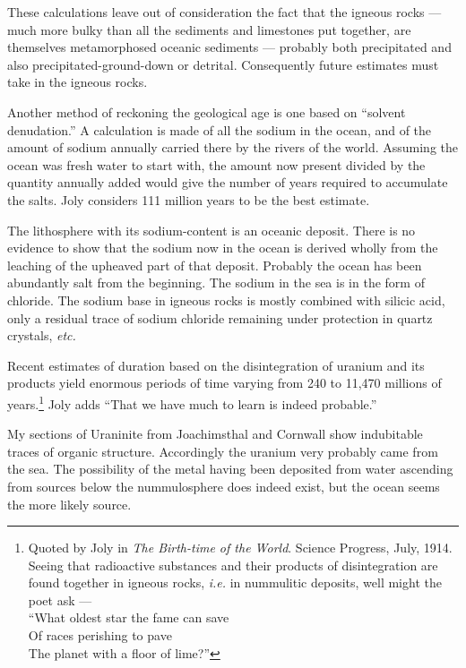\documentclass[a4paper, 12pt, oneside, landscape]{article}
\begin{document}
These calculations leave out of consideration the fact that the igneous rocks --- much more bulky than all the sediments and limestones put together, are themselves metamorphosed oceanic sediments --- probably both precipitated and also precipitated-ground-down or detrital. Consequently future estimates must take in the igneous rocks.

Another method of reckoning the geological age is one based on ``solvent denudation.'' A calculation is made of all the sodium in the ocean, and of the amount of sodium annually carried there by the rivers of the world. Assuming the ocean was fresh water to start with, the amount now present divided by the quantity annually added would give the number of years required to accumulate the salts. Joly considers 111 million years to be the best estimate.

The lithosphere with its sodium-content is an oceanic deposit. There is no evidence to show that the sodium now in the ocean is derived wholly from the leaching of the upheaved part of that deposit. Probably the ocean has been abundantly salt from the beginning. The sodium in the sea is in the form of chloride. The sodium base in igneous rocks is mostly combined with silicic acid, only a residual trace of sodium chloride remaining under protection in quartz crystals, \emph{etc.}

Recent estimates of duration based on the disintegration of uranium and its products yield enormous periods of time varying from 240 to 11,470 millions of years.\footnote{Quoted by Joly in \emph{The Birth-time of the World}. Science Progress, July, 1914. Seeing that radioactive substances and their products of disintegration are found together in igneous rocks, \emph{i.e.} in nummulitic deposits, well might the poet ask --- \\``What oldest star the fame can save\\Of races perishing to pave\\The planet with a floor of lime?''} Joly adds ``That we have much to learn is indeed probable.''

My sections of Uraninite from Joachimsthal and Cornwall show indubitable traces of organic structure. Accordingly the uranium very probably came from the sea. The possibility of the metal having been deposited from water ascending from sources below the nummulosphere does indeed exist, but the ocean seems the more likely source.
\end{document}
